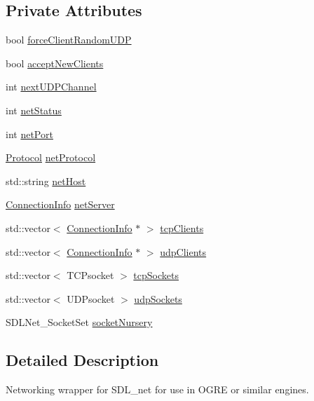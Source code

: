 \subsection*{Private Attributes}
\begin{DoxyCompactItemize}
\item 
bool \hyperlink{classNetManager_a2e5fedf3835e7c392ccb8b1a23ade8d4}{force\-Client\-Random\-U\-D\-P}
\item 
bool \hyperlink{classNetManager_a67d25cdb043a462709f1d29e071a5ce8}{accept\-New\-Clients}
\item 
int \hyperlink{classNetManager_a7505bdde90a24b85b6cb1d8d81404c5f}{next\-U\-D\-P\-Channel}
\item 
int \hyperlink{classNetManager_acd2ec7262ea71478204c9007b23d9fff}{net\-Status}
\item 
int \hyperlink{classNetManager_a2c14b6cf513287e5fb46a85ddb293201}{net\-Port}
\item 
\hyperlink{NetManager_8h_a9af285d1232beed01f31aac5d3a5469f}{Protocol} \hyperlink{classNetManager_ac24652f01ef284551be311bfc408be06}{net\-Protocol}
\item 
std\-::string \hyperlink{classNetManager_a2e1aedc97e5fb2f633faeabd2aa266c3}{net\-Host}
\item 
\hyperlink{structConnectionInfo}{Connection\-Info} \hyperlink{classNetManager_a002692771d60d8a4332941f33096fba0}{net\-Server}
\item 
std\-::vector$<$ \hyperlink{structConnectionInfo}{Connection\-Info} $\ast$ $>$ \hyperlink{classNetManager_abf9491e48d6bc19eacb148d294613b35}{tcp\-Clients}
\item 
std\-::vector$<$ \hyperlink{structConnectionInfo}{Connection\-Info} $\ast$ $>$ \hyperlink{classNetManager_ab5cbc9d5ddb14541adb07b748802446d}{udp\-Clients}
\item 
std\-::vector$<$ T\-C\-Psocket $>$ \hyperlink{classNetManager_a2314a1df7704bbc4c96d8d0133d78ee6}{tcp\-Sockets}
\item 
std\-::vector$<$ U\-D\-Psocket $>$ \hyperlink{classNetManager_aa99d99b6fa90707d9101c4e1a1835018}{udp\-Sockets}
\item 
S\-D\-L\-Net\-\_\-\-Socket\-Set \hyperlink{classNetManager_adc43306f83c33feb0fdd74e16c6583bb}{socket\-Nursery}
\end{DoxyCompactItemize}


\subsection{Detailed Description}
Networking wrapper for S\-D\-L\-\_\-net for use in O\-G\-R\-E or similar engines. 

